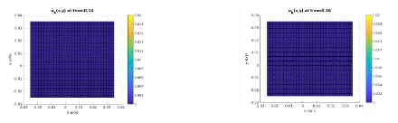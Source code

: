 \documentclass[8pt]{beamer}
\begin{document}
\begin{frame}
\begin{columns}
\begin{column}{0.25\textwidth}
\begin{figure}[h]
    			\includegraphics[width=\textwidth]{tc1-1/014.jpg}
    		\end{figure}
    	\end{column}
    	\begin{column}{0.25\textwidth}
    		\begin{figure}[h]
    			\includegraphics[width=\textwidth]{tc1-1/016.jpg}
    		\end{figure}
    	\end{column}
    \end{columns}
	\vspace{3mm}
\end{frame}
\end{document}
